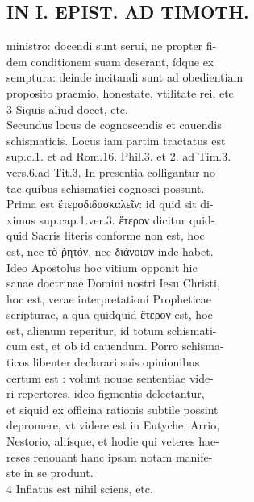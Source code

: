 \documentclass{article}
\begin{document}
\begin{pages}
\section*{IN I. EPIST. AD TIMOTH. \\
                }
ministro: docendi sunt serui, ne propter fi- \\
                dem conditionem suam deserant, ídque ex \\
                semptura: deinde incitandi sunt ad obedientiam \\
                proposito praemio, honestate, vtilitate rei, etc \\
                3 Siquis aliud docet, etc. \\
                Secundus locus de cognoscendis et cauendis \\
                schismaticis. Locus iam partim tractatus est \\
                sup.c.1. et ad Rom.16. Phil.3. et 2. ad Tim.3. \\
                vers.6.ad Tit.3. In presentia colligantur no- \\
                tae quibus schismatici cognosci possunt. \\
                Prima est ἔτεροδιδασκαλεῖν: id quid sit di- \\
                ximus sup.cap.1.ver.3. ἕτερον dicitur quid- \\
                quid Sacris literis conforme non est, hoc \\
                est, nec τὸ ῥητόν, nec διάνοιαν inde habet. \\
                Ideo Apostolus hoc vitium opponit hic \\
                sanae doctrinae Domini nostri Iesu Christi, \\
                hoc est, verae interpretationi Propheticae \\
                scripturae, a qua quidquid ἕτερον est, hoc \\
                est, alienum reperitur, id totum schismati- \\
                cum est, et ob id cauendum. Porro schisma- \\
                ticos libenter declarari suis opinionibus \\
                certum est : volunt nouae sententiae vide- \\
                ri repertores, ideo figmentis delectantur, \\
                et siquid ex officina rationis subtile possint \\
                depromere, vt videre est in Eutyche, Arrio, \\
                Nestorio, aliísque, et hodie qui veteres hae- \\
                reses renouant hanc ipsam notam manife- \\
                ste in se produnt. \\
                4 Inflatus est nihil sciens, etc. \\
                

\end{pages}
\end{document}
